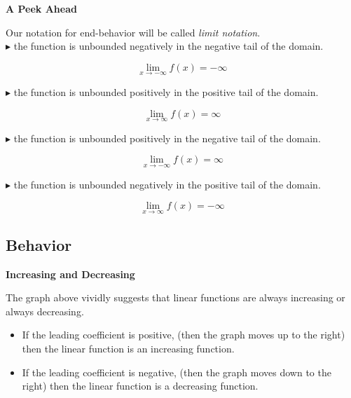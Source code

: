 \documentclass{ximera}
\begin{document}
\begin{notation}  \textbf{\textcolor{red!70!black}{A Peek Ahead}}

Our notation for end-behavior will be called \textit{limit notation}. \\



\textbf{\textcolor{blue!55!black}{$\blacktriangleright$}} the function is unbounded negatively in the negative tail of the domain.

\[
\lim\limits_{x \to -\infty} f(x) = -\infty
\]


\textbf{\textcolor{blue!55!black}{$\blacktriangleright$}} the function is unbounded positively in the positive tail of the domain.

\[
\lim\limits_{x \to \infty} f(x) = \infty
\]


\textbf{\textcolor{blue!55!black}{$\blacktriangleright$}} the function is unbounded positively in the negative tail of the domain.

\[
\lim\limits_{x \to -\infty} f(x) = \infty
\]


\textbf{\textcolor{blue!55!black}{$\blacktriangleright$}} the function is unbounded negatively in the positive tail of the domain.

\[
\lim\limits_{x \to \infty} f(x) = -\infty
\]


\end{notation}
















\subsection*{Behavior}



\textbf{\textcolor{blue!55!black}{Increasing and Decreasing}}






The graph above vividly suggests that linear functions are always increasing or always decreasing.


\begin{itemize}
\item If the leading coefficient is positive, (then the graph moves up to the right) then the linear function is an increasing function.

\item If the leading coefficient is negative, (then the graph moves down to the right) then the linear function is a decreasing function.
\end{itemize}
\end{document}
